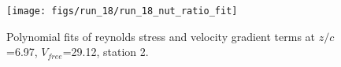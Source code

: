 \begin{figure}[H]
\centering
\texttt{[image: figs/run\_18/run\_18\_nut\_ratio\_fit]}
\caption{Polynomial fits of reynolds stress and velocity gradient terms at $z/c$=6.97, $V_{free}$=29.12, station 2.}
\label{fig:run_18_nut_ratio_fit}
\end{figure}


